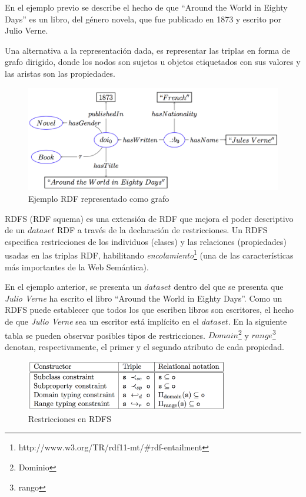 \documentclass[10pt,a4paper]{article}
\begin{document}
En el ejemplo previo se describe el hecho de que ``Around the World in Eighty Days'' es un libro, del género novela, que fue publicado en 1873 y escrito por Julio Verne.

Una alternativa a la representación dada, es representar las triplas en forma de grafo dirigido, donde los nodos son sujetos u objetos etiquetados con sus valores y las aristas son las propiedades.
\\
\begin{figure}[H]
\begin{center}
\includegraphics[width=400pt]{imgs/ejemplo_rdfgrafo}
\caption{Ejemplo RDF representado como grafo}
\end{center}
\end{figure}

RDFS (RDF squema) es una extensión de RDF que mejora el poder descriptivo de un $dataset$ RDF a través de la declaración de restricciones. Un RDFS especifica restricciones de los individuos (clases) y las relaciones (propiedades) usadas en las triplas RDF, habilitando \textit{encolamiento}\footnote{http://www.w3.org/TR/rdf11-mt/\#rdf-entailment} (una de las características más importantes de la Web Semántica). 

En el ejemplo anterior, se presenta un $dataset$ dentro del que se presenta que \textit{Julio Verne} ha escrito el libro ``Around the World in Eighty Days''. Como un RDFS puede establecer que todos los que escriben libros son escritores, el hecho de que \textit{Julio Verne} sea un escritor está implícito en el $dataset$.
\newpage
En la siguiente tabla se pueden observar posibles tipos de restricciones. $Domain$\footnote{Dominio} y $range$\footnote{rango} denotan, respectivamente, el primer y el segundo atributo de cada propiedad.

\begin{figure}[h]
\begin{center}
\includegraphics[width=250pt]{imgs/constraints}
\caption{Restricciones en RDFS}
\end{center}
\end{figure}
\end{document}
